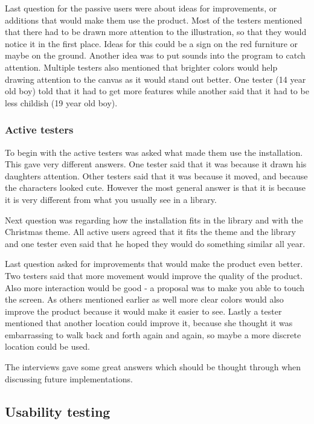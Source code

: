 Last question for the passive users were about ideas for improvements, or additions that would make them use the product.
Most of the testers mentioned that there had to be drawn more attention to the illustration, so that they would notice it in the first place. Ideas for this could be a sign on the red furniture or maybe on the ground. Another idea was to put sounds into the program to catch attention. Multiple testers also mentioned that brighter colors would help drawing attention to the canvas as it would stand out better.
One tester (14 year old boy) told that it had to get more features while another said that it had to be less childish (19 year old boy).

\subsubsection{Active testers}
To begin with the active testers was asked what made them use the installation. This gave very different answers. One tester said that it was because it drawn his daughters attention. Other testers said that it was because it moved, and because the characters looked cute. However the most general answer is that it is because it is very different from what you usually see in a library.

Next question was regarding how the installation fits in the library and with the Christmas theme. All active users agreed that it fits the theme and the library and one tester even said that he hoped they would do something similar all year.

Last question asked for improvements that would make the product even better. Two testers said that more movement would improve the quality of the product. Also more interaction would be good - a proposal was to make you able to touch the screen.
As others mentioned earlier as well more clear colors would also improve the product because it would make it easier to see. Lastly a tester mentioned that another location could improve it, because she thought it was embarrassing to walk back and forth again and again, so maybe a more discrete location could be used.

The interviews gave some great answers which should be thought through when discussing future implementations.   
  
\subsection{Usability testing}

